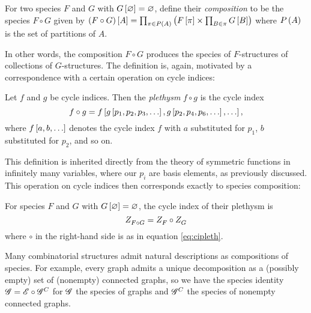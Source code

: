 \documentclass[distribution,draft]{brandiss} %
\numberwithin{section}{chapter}
\numberwithin{figure}{chapter}
\begin{document}
\begin{definition}
  \label{def:speccomp}
  For two species $F$ and $G$ with $G \left[ {\varnothing} \right] = \varnothing$, define their \emph{composition} to be the species $F \circ G$ given by $\left( {F \circ G} \right) \left[ {A} \right] = \prod_{\pi \in P \left( {A} \right)} \left( {F \left[ {\pi} \right] \times \prod_{B \in \pi} G \left[ {B} \right]} \right)$ where $P \left( {A} \right)$ is the set of partitions of $A$.
\end{definition}
In other words, the composition $F \circ G$ produces the species of $F$-structures of collections of $G$-structures.
The definition is, again, motivated by a correspondence with a certain operation on cycle indices:
\begin{definition}
  \label{def:cipleth}
  Let $f$ and $g$ be cycle indices. Then the \emph{plethysm} $f \circ g$ is the cycle index
  \begin{equation}
    \label{eq:cipleth}
    f \circ g = f \left[ {g \left[ {p_{1}, p_{2}, p_{3}, \dots} \right], g \left[ {p_{2}, p_{4}, p_{6}, \dots} \right], \dots} \right],
  \end{equation}
  where $f \left[ {a, b, \dots} \right]$ denotes the cycle index $f$ with $a$ substituted for $p_{1}$, $b$ substituted for $p_{2}$, and so on.
\end{definition}
This definition is inherited directly from the theory of symmetric functions in infinitely many variables, where our $p_{i}$ are basis elements, as previously discussed. This operation on cycle indices then corresponds exactly to species composition:
\begin{theorem}
  \label{thm:speccompci}
  For species $F$ and $G$ with $G \left[ {\varnothing} \right] = \varnothing$, the cycle index of their plethysm is
  \begin{equation}
    \label{eq:speccompci}
     Z_{F \circ G}^{}  =  Z_{F}^{}  \circ  Z_{G}^{} 
  \end{equation}
  where $\circ$ in the right-hand side is as in equation \eqref{eq:cipleth}.
\end{theorem}
Many combinatorial structures admit natural descriptions as compositions of species.
For example, every graph admits a unique decomposition as a (possibly empty) set of (nonempty) connected graphs, so we have the species identity $\mathscr{G} = \mathscr{E} \circ \mathscr{G}^{C}$ for $\mathscr{G}$ the species of graphs and $\mathscr{G}^{C}$ the species of nonempty connected graphs.
\end{document}
